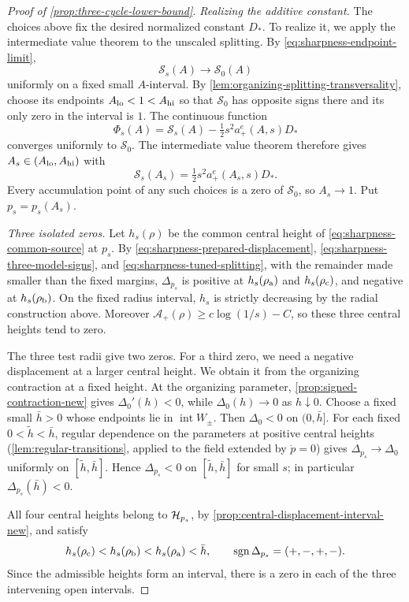 \begin{proof}[Proof of \cref{prop:three-cycle-lower-bound}]
\emph{Realizing the additive constant.}
The choices above fix the desired normalized constant \(D_*\).
To realize it, we apply the intermediate value theorem to the
unscaled splitting. By
\eqref{eq:sharpness-endpoint-limit},
\[
 \mathcal S_s(A)\longrightarrow \mathcal S_0(A)
\]
uniformly on a fixed small \(A\)-interval. By
\cref{lem:organizing-splitting-transversality}, choose its endpoints
\(A_{\rm lo}<1<A_{\rm hi}\) so that \(\mathcal S_0\) has opposite
signs there and its only zero in the interval is \(1\).
The continuous function
\[
 \Phi_s(A)=\mathcal S_s(A)-\tfrac12s^2a_+^e(A,s)D_*
\]
converges uniformly to \(\mathcal S_0\). The intermediate value theorem
therefore gives \(A_s\in(A_{\rm lo},A_{\rm hi})\) with
\begin{equation}
\label{eq:sharpness-tuned-splitting}
 \mathcal S_s(A_s)=\tfrac12s^2a_+^e(A_s,s)D_*.
\end{equation}
Every accumulation point of any such choices is a zero of
\(\mathcal S_0\), so \(A_s\to1\). Put \(p_s=p_s(A_s)\).

\emph{Three isolated zeros.}
Let \(h_s(\rho)\) be the common central height of
\eqref{eq:sharpness-common-source} at \(p_s\).
By \eqref{eq:sharpness-prepared-displacement},
\eqref{eq:sharpness-three-model-signs}, and
\eqref{eq:sharpness-tuned-splitting}, with the remainder made
smaller than the fixed margins, \(\Delta_{p_s}\) is positive at
\(h_s(\rho_{\rm a})\) and \(h_s(\rho_{\rm c})\), and negative at
\(h_s(\rho_{\rm b})\). On the fixed radius interval, \(h_s\) is
strictly decreasing by the radial construction above.
Moreover \(\mathcal A_+(\rho)\ge c\log(1/s)-C\), so these three
central heights tend to zero.

The three test radii give two zeros. For a third zero, we need a
negative displacement at a larger central height. We obtain it from
the organizing contraction at a fixed height.
At the organizing parameter, \cref{prop:signed-contraction-new}
gives \(\Delta_0'(h)<0\), while
\(\Delta_0(h)\to0\) as \(h\downarrow0\). Choose a fixed small
\(\bar h>0\) whose endpoints lie in \(\operatorname{int}W_\pm\). Then
\(\Delta_0<0\) on \((0,\bar h]\). For each fixed
\(0<\widetilde h<\bar h\), regular dependence on the parameters at
positive central heights (\cref{lem:regular-transitions}, applied to the
field extended by \(\dot p=0\)) gives
\(\Delta_{p_s}\to\Delta_0\) uniformly on \([\widetilde h,\bar h]\).
Hence \(\Delta_{p_s}<0\) on \([\widetilde h,\bar h]\) for small \(s\);
in particular \(\Delta_{p_s}(\bar h)<0\).

All four central heights belong to \(\mathcal H_{p_s}\), by
\cref{prop:central-displacement-interval-new}, and satisfy
\begin{equation}
\label{eq:sharpness-four-source-signs}
 h_s(\rho_{\rm c})<h_s(\rho_{\rm b})<h_s(\rho_{\rm a})<\bar h,
 \qquad
 \operatorname{sgn}\Delta_{p_s}=(+,-,+,-).
\end{equation}
Since the admissible heights form an interval, there is a zero in
each of the three intervening open intervals.


\end{proof}
